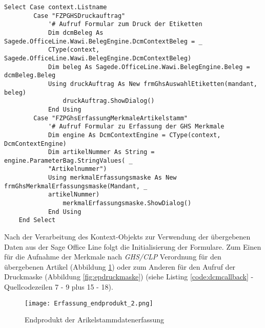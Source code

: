\begin{lstlisting}[style=A, caption=Verarbeitung Aufruf Formulare aus Sage Office Line (.NET),
label={code:dcmcallback}]
    Select Case context.Listname
        Case "FZPGHSDruckauftrag"
            '# Aufruf Formular zum Druck der Etiketten
            Dim dcmBeleg As Sagede.OfficeLine.Wawi.BelegEngine.DcmContextBeleg = _
            CType(context, Sagede.OfficeLine.Wawi.BelegEngine.DcmContextBeleg)
            Dim beleg As Sagede.OfficeLine.Wawi.BelegEngine.Beleg = dcmBeleg.Beleg
            Using druckAuftrag As New frmGhsAuswahlEtiketten(mandant, beleg)
                druckAuftrag.ShowDialog()
            End Using
        Case "FZPGhsErfassungMerkmaleArtikelstamm"
            '# Aufruf Formular zu Erfassung der GHS Merkmale
            Dim engine As DcmContextEngine = CType(context, DcmContextEngine)
            Dim artikelNummer As String = engine.ParameterBag.StringValues( _ 
            "Artikelnummer")
            Using merkmalErfassungsmaske As New frmGhsMerkmalErfassungsmaske(Mandant, _
            artikelNummer)
                merkmalErfassungsmaske.ShowDialog()
            End Using
    End Select
\end{lstlisting}

\noindent
Nach der Verarbeitung des Kontext-Objekts zur Verwendung der übergebenen Daten aus der Sage
Office Line folgt die Initialisierung der Formulare. Zum Einen für die Aufnahme der Merkmale nach 
\emph{GHS/CLP} Verordnung für den übergebenen Artikel (Abbildung \ref{fig:eperfassungsmaske})
oder zum Anderen für den Aufruf der Druckmaske (Abbildung \ref{fig:epdruckmaske}) (siehe Listing
\ref{code:dcmcallback} - Quellcodezeilen 7 - 9 plus 15 - 18).

\begin{figure}[H]
    \centering
    \texttt{[image: Erfassung\_endprodukt\_2.png]}
    \caption[Endprodukt der Arikelstammdatenerfassung]
    {\small{Endprodukt der Arikelstammdatenerfassung}}
    \label{fig:eperfassungsmaske}
\end{figure}

